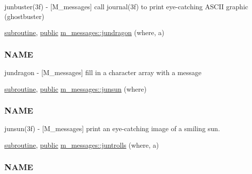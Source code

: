 \begin{DoxyCompactItemize}
\begin{DoxyCompactList}
junbuster(3f) -\/ \mbox{[}M\+\_\+messages\mbox{]} call journal(3f) to print eye-\/catching A\+S\+C\+II graphic (ghostbuster) \end{DoxyCompactList}\item 
\hyperlink{M__stopwatch_83_8txt_acfbcff50169d691ff02d4a123ed70482}{subroutine}, \hyperlink{M__stopwatch_83_8txt_a2f74811300c361e53b430611a7d1769f}{public} \hyperlink{namespacem__messages_a6bcbaab6d75a4389f2b77860ccc13a7c}{m\+\_\+messages\+::jundragon} (where, a)
\begin{DoxyCompactList}\small\item\em \subsubsection*{N\+A\+ME}

jundragon -\/ \mbox{[}M\+\_\+messages\mbox{]} fill in a character array with a message \end{DoxyCompactList}\item 
\hyperlink{M__stopwatch_83_8txt_acfbcff50169d691ff02d4a123ed70482}{subroutine}, \hyperlink{M__stopwatch_83_8txt_a2f74811300c361e53b430611a7d1769f}{public} \hyperlink{namespacem__messages_a93650d7a0b4288d714aa9eb575366137}{m\+\_\+messages\+::junsun} (where)
\begin{DoxyCompactList}\small\item\em \subsubsection*{N\+A\+ME}

junsun(3f) -\/ \mbox{[}M\+\_\+messages\mbox{]} print an eye-\/catching image of a smiling sun. \end{DoxyCompactList}\item 
\hyperlink{M__stopwatch_83_8txt_acfbcff50169d691ff02d4a123ed70482}{subroutine}, \hyperlink{M__stopwatch_83_8txt_a2f74811300c361e53b430611a7d1769f}{public} \hyperlink{namespacem__messages_ab7a9bba52e514a4183070ae0fc6ccebd}{m\+\_\+messages\+::juntrolls} (where, a)
\begin{DoxyCompactList}\small\item\em \subsubsection*{N\+A\+ME}


\end{DoxyCompactList}
\end{DoxyCompactItemize}
